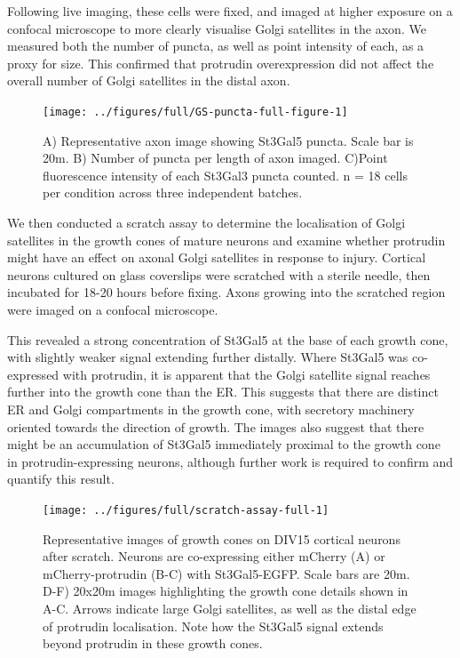 \documentclass[
  12pt,
  a4paper,
]{book}
\begin{document}
Following live imaging, these cells were fixed, and imaged at higher exposure on a confocal microscope to more clearly visualise Golgi satellites in the axon. We measured both the number of puncta, as well as point intensity of each, as a proxy for size. This confirmed that protrudin overexpression did not affect the overall number of Golgi satellites in the distal axon.

\begin{figure}
\texttt{[image: ../figures/full/GS-puncta-full-figure-1]} \caption[Protrudin effect on Golgi satellite abundance and size in the distal axon]{A) Representative axon image showing St3Gal5 puncta.  Scale bar is 20\textmu{}m.  B) Number of puncta per length of axon imaged.  C)Point fluorescence intensity of each St3Gal3 puncta counted.  n = 18 cells per condition across three independent batches.}\label{fig:GS-puncta-full-figure}
\end{figure}

We then conducted a scratch assay to determine the localisation of Golgi satellites in the growth cones of mature neurons and examine whether protrudin might have an effect on axonal Golgi satellites in response to injury. Cortical neurons cultured on glass coverslips were scratched with a sterile needle, then incubated for 18-20 hours before fixing. Axons growing into the scratched region were imaged on a confocal microscope.

This revealed a strong concentration of St3Gal5 at the base of each growth cone, with slightly weaker signal extending further distally. Where St3Gal5 was co-expressed with protrudin, it is apparent that the Golgi satellite signal reaches further into the growth cone than the ER. This suggests that there are distinct ER and Golgi compartments in the growth cone, with secretory machinery oriented towards the direction of growth. The images also suggest that there might be an accumulation of St3Gal5 immediately proximal to the growth cone in protrudin-expressing neurons, although further work is required to confirm and quantify this result.

\begin{figure}
\texttt{[image: ../figures/full/scratch-assay-full-1]} \caption[Scratch assay of neurons co-expressing protrudin and St3Gal5]{Representative images of growth cones on DIV15 cortical neurons after scratch.  Neurons are co-expressing either mCherry (A) or mCherry-protrudin (B-C) with St3Gal5-EGFP.  Scale bars are 20\textmu{}m.  D-F) 20x20\textmu{}m images highlighting the growth cone details shown in A-C.  Arrows indicate large Golgi satellites, as well as the distal edge of protrudin localisation.  Note how the St3Gal5 signal extends beyond protrudin in these growth cones.}\label{fig:scratch-assay-full}
\end{figure}
\end{document}
